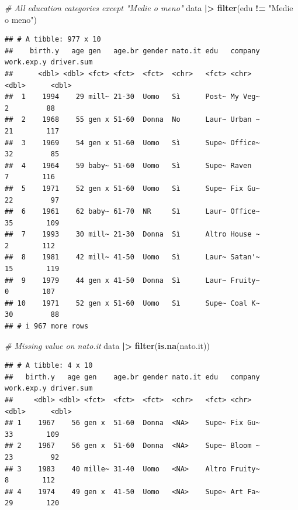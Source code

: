 \documentclass[
]{book}
\newenvironment{Shaded}{\begin{snugshade}}{\end{snugshade}}
\newcommand{\CommentTok}[1]{\textcolor[rgb]{0.56,0.35,0.01}{\textit{#1}}}
\newcommand{\FunctionTok}[1]{\textcolor[rgb]{0.13,0.29,0.53}{\textbf{#1}}}
\newcommand{\NormalTok}[1]{#1}
\newcommand{\SpecialCharTok}[1]{\textcolor[rgb]{0.81,0.36,0.00}{\textbf{#1}}}
\newcommand{\StringTok}[1]{\textcolor[rgb]{0.31,0.60,0.02}{#1}}
\begin{document}
\begin{Shaded}
\begin{Highlighting}[]
\CommentTok{\# All education categories except "Medie o meno"}
\NormalTok{data }\SpecialCharTok{|\textgreater{}} 
  \FunctionTok{filter}\NormalTok{(edu }\SpecialCharTok{!=} \StringTok{"Medie o meno"}\NormalTok{)}
\end{Highlighting}
\end{Shaded}

\begin{verbatim}
## # A tibble: 977 x 10
##    birth.y   age gen   age.br gender nato.it edu   company work.exp.y driver.sum
##      <dbl> <dbl> <fct> <fct>  <fct>  <chr>   <fct> <chr>        <dbl>      <dbl>
##  1    1994    29 mill~ 21-30  Uomo   Sì      Post~ My Veg~          2         88
##  2    1968    55 gen x 51-60  Donna  No      Laur~ Urban ~         21        117
##  3    1969    54 gen x 51-60  Uomo   Sì      Supe~ Office~         32         85
##  4    1964    59 baby~ 51-60  Uomo   Sì      Supe~ Raven            7        116
##  5    1971    52 gen x 51-60  Uomo   Sì      Supe~ Fix Gu~         22         97
##  6    1961    62 baby~ 61-70  NR     Sì      Laur~ Office~         35        109
##  7    1993    30 mill~ 21-30  Donna  Sì      Altro House ~          2        112
##  8    1981    42 mill~ 41-50  Uomo   Sì      Laur~ Satan'~         15        119
##  9    1979    44 gen x 41-50  Donna  Sì      Laur~ Fruity~          0        107
## 10    1971    52 gen x 51-60  Uomo   Sì      Supe~ Coal K~         30         88
## # i 967 more rows
\end{verbatim}

\begin{Shaded}
\begin{Highlighting}[]
\CommentTok{\# Missing value on nato.it}
\NormalTok{data }\SpecialCharTok{|\textgreater{}} 
  \FunctionTok{filter}\NormalTok{(}\FunctionTok{is.na}\NormalTok{(nato.it))}
\end{Highlighting}
\end{Shaded}

\begin{verbatim}
## # A tibble: 4 x 10
##   birth.y   age gen    age.br gender nato.it edu   company work.exp.y driver.sum
##     <dbl> <dbl> <fct>  <fct>  <fct>  <chr>   <fct> <chr>        <dbl>      <dbl>
## 1    1967    56 gen x  51-60  Donna  <NA>    Supe~ Fix Gu~         33        109
## 2    1967    56 gen x  51-60  Donna  <NA>    Supe~ Bloom ~         23         92
## 3    1983    40 mille~ 31-40  Uomo   <NA>    Altro Fruity~          8        112
## 4    1974    49 gen x  41-50  Uomo   <NA>    Supe~ Art Fa~         29        120
\end{verbatim}
\end{document}
